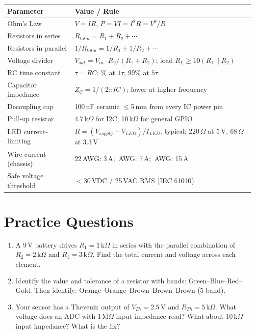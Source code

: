 \documentclass[11pt,letterpaper,twoside,openany]{book}
\begin{document}
\begin{quickrefbox}
\begin{table}[H]\centering\small
\begin{tabularx}{\textwidth}{l X}
\toprule
\textbf{Parameter} & \textbf{Value / Rule} \\
\midrule
Ohm's Law & $V = IR$, \; $P = VI = I^2R = V^2/R$ \\
Resistors in series & $R_{total} = R_1 + R_2 + \cdots$ \\
Resistors in parallel & $1/R_{total} = 1/R_1 + 1/R_2 + \cdots$ \\
Voltage divider & $V_{out} = V_{in} \cdot R_2/(R_1 + R_2)$; \; load $R_L \geq 10(R_1 \| R_2)$ \\
RC time constant & $\tau = RC$; \; 63\% at $1\tau$, 99\% at $5\tau$ \\
Capacitor impedance & $Z_C = 1/(2\pi f C)$; \; lower at higher frequency \\
Decoupling cap & 100\,nF ceramic $\leq$5\,mm from every IC power pin \\
Pull-up resistor & 4.7\,k$\Omega$ for I2C; 10\,k$\Omega$ for general GPIO \\
LED current-limiting & $R = (V_{supply} - V_{LED})/I_{LED}$; \; typical: 220\,$\Omega$ at 5\,V, 68\,$\Omega$ at 3.3\,V \\
Wire current (chassis) & 22\,AWG: 3\,A; \; 18\,AWG: 7\,A; \; 14\,AWG: 15\,A \\
Safe voltage threshold & $<$30\,VDC / 25\,VAC RMS (IEC 61010) \\
\bottomrule
\end{tabularx}
\end{table}
\end{quickrefbox}

\section{Practice Questions}
\begin{enumerate}[leftmargin=1.5em]
\item A 9\,V battery drives $R_1 = 1\,\text{k}\Omega$ in series with the parallel combination of $R_2 = 2\,\text{k}\Omega$ and $R_3 = 3\,\text{k}\Omega$. Find the total current and voltage across each element.
\item Identify the value and tolerance of a resistor with bands: Green--Blue--Red--Gold. Then identify: Orange--Orange--Brown--Brown--Brown (5-band).
\item Your sensor has a Thevenin output of $V_{Th} = 2.5$\,V and $R_{Th} = 5\,\text{k}\Omega$. What voltage does an ADC with 1\,M$\Omega$ input impedance read? What about 10\,k$\Omega$ input impedance? What is the fix?
\end{enumerate}
\end{document}
